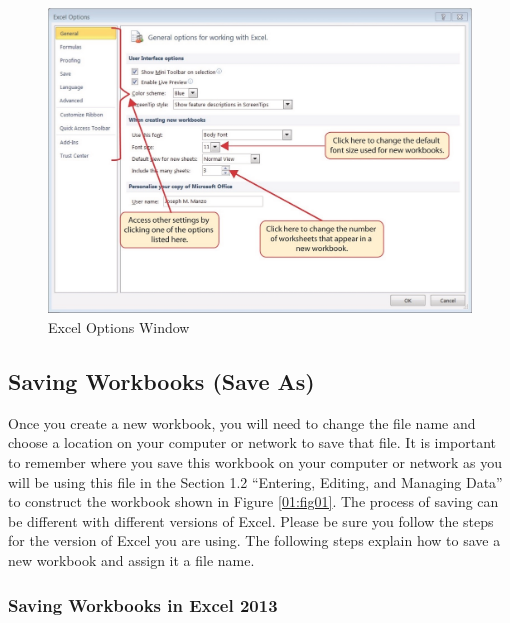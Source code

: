 \begin{figure}[H]
	\centering
	\includegraphics[width=\maxwidth{.95\linewidth}]{gfx/Ch01_fig10}
	\caption{Excel Options Window}
	\label{01:fig10}
\end{figure}

\subsection{Saving Workbooks (Save As)}

Once you create a new workbook, you will need to change the file name and choose a location on your computer or network to save that file. It is important to remember where you save this workbook on your computer or network as you will be using this file in the Section 1.2 “Entering, Editing, and Managing Data” to construct the workbook shown in Figure \ref{01:fig01}. The process of saving can be different with different versions of Excel. Please be sure you follow the steps for the version of Excel you are using. The following steps explain how to save a new workbook and assign it a file name.

\subsubsection{Saving Workbooks in Excel 2013}

